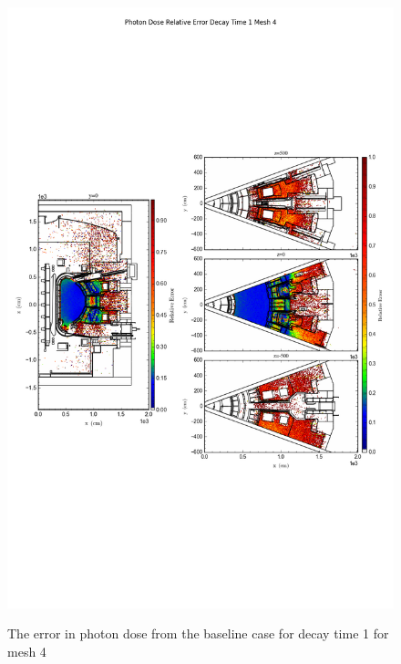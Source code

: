 \begin{figure}[ht!]
\centering
\includegraphics[trim={0cm 9cm 0cm 10cm},clip,scale=0.75]{../plots/final_model/Photon_Dose_Relative_Error_Decay_Time_1_Mesh_4.png}
\label{fig:photons_dc1_no4bc_m4_error}
\caption{The error in photon dose from the baseline case for decay time 1 for mesh 4}
\end{figure}
